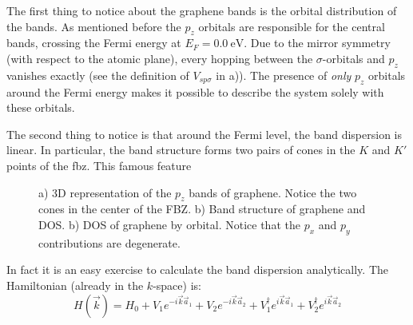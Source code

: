 The first thing to notice about the graphene bands is the orbital distribution of the bands. As mentioned before the $p_z$ orbitals are responsible for the central bands, crossing the Fermi energy at $E_F=\SI{0.0}{\eV}$. Due to the mirror symmetry (with respect to the atomic plane), every hopping between the $\sigma$-orbitals and $p_z$ vanishes exactly (see the definition of $V_{sp\sigma}$ in a)).
The presence of \textit{only} $p_z$ orbitals around the Fermi energy makes it possible to describe the system solely with these orbitals.

The second thing to notice is that around the Fermi level, the band dispersion is linear. In particular, the band structure forms two pairs of cones in the $K$ and $K'$ points of the \ac{fbz}. This famous feature %
\begin{figure}[h!]
\begin{center}
\end{center}
\vspace{-25pt}
\caption{a) 3D representation of the $p_z$ bands of graphene. Notice the two cones in the center of the FBZ. b) Band structure of graphene and DOS. b) DOS of graphene by orbital. Notice that the $p_x$ and $p_y$ contributions are degenerate.}
\label{bandsG}
\end{figure}
\FloatBarrier
In fact it is an easy exercise to calculate the band dispersion analytically. The Hamiltonian (already in the $k$-space) is:
\begin{equation}
   H(\vec{k}) = H_0 + V_1 e^{-i\vec{k}\vec{a}_1} + V_2 e^{-i\vec{k}\vec{a}_2}+
   V^{\dagger}_1 e^{i\vec{k}\vec{a}_1} + V^{\dagger}_2 e^{i\vec{k}\vec{a}_2}
\label{hk}
\end{equation}
